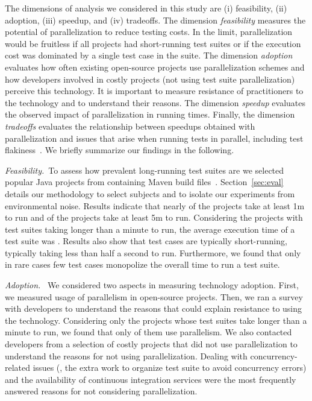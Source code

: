 The dimensions of analysis we considered in this study are (i)
feasibility, (ii) adoption, (iii) speedup, and (iv) tradeoffs.  The
dimension \emph{feasibility} measures the potential of parallelization
to reduce testing costs.  In the limit, parallelization would be
fruitless if all projects had short-running test suites or if the
execution cost was dominated by a single test case in the suite.  The
dimension \emph{adoption} evaluates how often existing open-source
projects use parallelization schemes and how developers involved in
costly projects (not using test suite parallelization) perceive this
technology.  It is important to measure resistance of practitioners to
the technology and to understand their reasons.  The dimension
\emph{speedup} evaluates the observed impact of
parallelization in running times.  Finally, the dimension
\emph{tradeoffs} evaluates the relationship between speedups obtained
with parallelization and issues that arise 
when running tests in parallel, including test
flakiness~\citet{luo-etal-fse2014,bell-etal-esecfse2015}.  We briefly summarize our findings
in the following.


\noindent\emph{Feasibility.}~To assess how prevalent long-running test suites
are we selected \numSubjs{} popular Java projects from \github{} containing
Maven build files~\citet{maven}.  Section~\ref{sec:eval} details our methodology
to select subjects and to isolate our experiments from environmental noise.
Results indicate that nearly \percentMedLongRunning{} of the projects take at
least 1m to run and \percentLongRunning{} of the projects take at least 5m to
run.  Considering the \numMedLong{} projects with test suites taking longer than
a minute to run, the average execution time of a test suite was
\averageMedLongRunning{}.  Results also show that test cases are typically
short-running, typically taking less than half a second to run.  Furthermore, we
found that only in rare cases few test cases monopolize the overall time to run
a test suite.


\noindent\emph{Adoption.}~ We considered two aspects in measuring technology
adoption.  First, we measured usage of parallelism in open-source projects.
Then, we ran a survey with developers to understand the reasons that could
explain resistance to using the technology.
Considering only the projects whose test suites take longer than a minute to
run, we found that only \percentParallelUpdated{} of them use parallelism.  We
also contacted developers from a selection of costly projects that did not use
parallelization to understand the reasons for not using parallelization.
Dealing with concurrency-related issues (\eg{}, the extra work to organize test
suite to avoid concurrency errors) and the availability of continuous
integration services were the most frequently answered reasons for not
considering parallelization.

